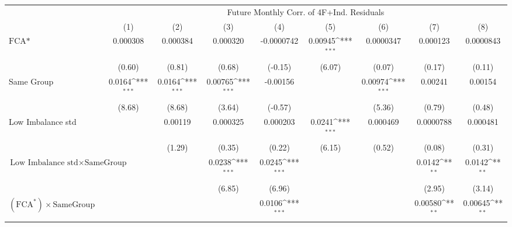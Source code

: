 {
\def\sym#1{\ifmmode^{#1}\else\(^{#1}\)\fi}
\begin{tabular}{l*{8}{c}}
\hline\hline
                &\multicolumn{8}{c}{Future Monthly Corr. of 4F+Ind. Residuals}                                                                                          \\\cmidrule(lr){2-9}
                &\multicolumn{1}{c}{(1)}         &\multicolumn{1}{c}{(2)}         &\multicolumn{1}{c}{(3)}         &\multicolumn{1}{c}{(4)}         &\multicolumn{1}{c}{(5)}         &\multicolumn{1}{c}{(6)}         &\multicolumn{1}{c}{(7)}         &\multicolumn{1}{c}{(8)}         \\
\hline
$ \text{FCA*} $ & 0.000308         & 0.000384         & 0.000320         &-0.0000742         &  0.00945\sym{***}&0.0000347         & 0.000123         &0.0000843         \\
                &   (0.60)         &   (0.81)         &   (0.68)         &  (-0.15)         &   (6.07)         &   (0.07)         &   (0.17)         &   (0.11)         \\
[1em]
Same Group      &   0.0164\sym{***}&   0.0164\sym{***}&  0.00765\sym{***}& -0.00156         &                  &  0.00974\sym{***}&  0.00241         &  0.00154         \\
                &   (8.68)         &   (8.68)         &   (3.64)         &  (-0.57)         &                  &   (5.36)         &   (0.79)         &   (0.48)         \\
[1em]
Low Imbalance std&                  &  0.00119         & 0.000325         & 0.000203         &   0.0241\sym{***}& 0.000469         &0.0000788         & 0.000481         \\
                &                  &   (1.29)         &   (0.35)         &   (0.22)         &   (6.15)         &   (0.52)         &   (0.08)         &   (0.31)         \\
[1em]
 $ \text{Low Imbalance std} \times {\text{SameGroup} } $ &                  &                  &   0.0238\sym{***}&   0.0245\sym{***}&                  &                  &   0.0142\sym{**} &   0.0142\sym{**} \\
                &                  &                  &   (6.85)         &   (6.96)         &                  &                  &   (2.95)         &   (3.14)         \\
[1em]
 $ (\text{FCA}^*) \times {\text{SameGroup} }  $ &                  &                  &                  &   0.0106\sym{***}&                  &                  &  0.00580\sym{**} &  0.00645\sym{**} \\

\end{tabular}}
